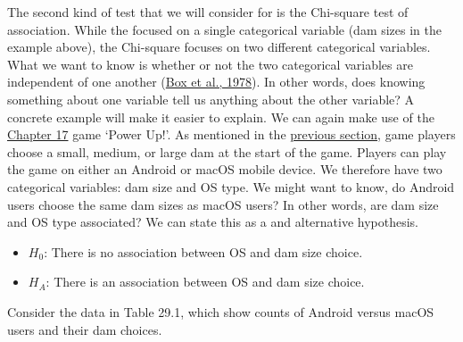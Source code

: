\documentclass[
  openany]{krantz}
\providecommand{\tightlist}{%
  \setlength{\itemsep}{0pt}\setlength{\parskip}{0pt}}
\begin{document}
The second kind of test that we will consider for  is the Chi-square test of association.
While the  focused on a single categorical variable (dam sizes in the example above), the Chi-square  focuses on two different categorical variables.
What we want to know is whether or not the two categorical variables are independent of one another (\protect\hyperlink{ref-Box1978}{Box et al., 1978}).
In other words, does knowing something about one variable tell us anything about the other variable?
A concrete example will make it easier to explain.
We can again make use of the \protect\hyperlink{Chapter_17}{Chapter 17} game `Power Up!'.
As mentioned in the \protect\hyperlink{chi-squared-goodness-of-fit}{previous section}, game players choose a small, medium, or large dam at the start of the game.
Players can play the game on either an Android or macOS mobile device.
We therefore have two categorical variables: dam size and OS type.
We might want to know, do Android users choose the same dam sizes as macOS users?
In other words, are dam size and OS type associated?
We can state this as a  and alternative hypothesis.

\begin{itemize}
\tightlist
\item
  \(H_{0}\): There is no association between OS and dam size choice.
\item
  \(H_{A}\): There is an association between OS and dam size choice.
\end{itemize}

Consider the data in Table 29.1, which show counts of Android versus macOS users and their dam choices.
\end{document}
